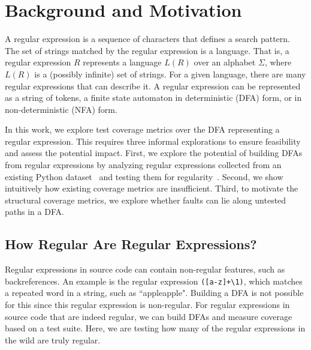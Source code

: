 

\section{Background and Motivation}
\label{sec:motive}
A regular expression is a sequence of characters that defines a search pattern. 
The set of strings matched by the regular expression is a language. 
That is, a regular expression $R$ represents a language $L(R)$ over an alphabet $\Sigma$, where $L(R)$ is a (possibly infinite) set of strings. 
For a given language, there are many regular expressions that can describe it. 
A regular expression can be represented as a string of tokens, a finite state automaton in deterministic (DFA) form, or in non-deterministic (NFA) form.%


In this work, we explore test coverage metrics over the DFA representing a regular expression. This requires three informal explorations to ensure feasibility and assess the potential impact. 
First, we explore the potential of building DFAs from regular expressions by analyzing regular expressions collected from an existing Python dataset~\cite{chapman2016} and testing them for regularity~\cite{sipser2006introduction}.
Second, we show intuitively how existing coverage metrics are insufficient. 
Third, to motivate the structural coverage metrics, we explore whether faults can lie along untested paths in a DFA. 



\subsection{How Regular Are Regular Expressions?}
\label{regularregularexpressions}
Regular expressions in source code can contain non-regular features, such as backreferences. An example is the regular expression \verb!([a-z]+\1)!, which matches a repeated word in a string, such as ``appleapple". Building a DFA is not possible for this since this regular expression is non-regular. For regular expressions in source code that are indeed regular, we can build DFAs and measure coverage based on a test suite. 
Here, we are testing how many of the regular expressions in the wild are truly regular. 

